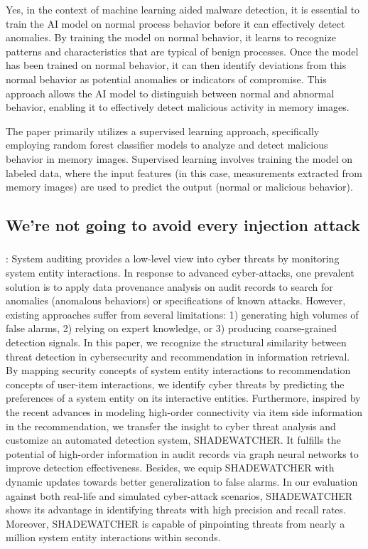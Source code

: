 \documentclass{article}
\begin{document}
Yes, in the context of machine learning aided malware detection, it is essential to train the AI model on normal process behavior before it can effectively detect anomalies. By training the model on normal behavior, it learns to recognize patterns and characteristics that are typical of benign processes. Once the model has been trained on normal behavior, it can then identify deviations from this normal behavior as potential anomalies or indicators of compromise. This approach allows the AI model to distinguish between normal and abnormal behavior, enabling it to effectively detect malicious activity in memory images.

The paper primarily utilizes a supervised learning approach, specifically employing random forest classifier models to analyze and detect malicious behavior in memory images. Supervised learning involves training the model on labeled data, where the input features (in this case, measurements extracted from memory images) are used to predict the output (normal or malicious behavior).

\subsection{We're not going to avoid every injection attack}

\subsubsection{\textcite{Zengy:2022}}
\textbf{}:  System auditing provides a low-level view into cyber threats by monitoring system entity interactions. In response to advanced cyber-attacks, one prevalent solution is to apply data provenance analysis on audit records to search for anomalies (anomalous behaviors) or specifications of known attacks. However, existing approaches suffer from several limitations: 1) generating high volumes of false alarms, 2) relying on expert knowledge, or 3) producing coarse-grained detection signals. In this paper, we recognize the structural similarity between threat detection in cybersecurity and recommendation in information retrieval. By mapping security concepts of system entity interactions to recommendation concepts of user-item interactions, we identify cyber threats by predicting the preferences of a system entity on its interactive entities. Furthermore, inspired by the recent advances in modeling high-order connectivity via item side information in the recommendation, we transfer the insight to cyber threat analysis and customize an automated detection system, SHADEWATCHER. It fulfills the potential of high-order information in audit records via graph neural networks to improve detection effectiveness. Besides, we equip SHADEWATCHER with dynamic updates towards better generalization to false alarms. In our evaluation against both real-life and simulated cyber-attack scenarios, SHADEWATCHER shows its advantage in identifying threats with high precision and recall rates. Moreover, SHADEWATCHER is capable of pinpointing threats from nearly a million system entity interactions within seconds.
\end{document}
